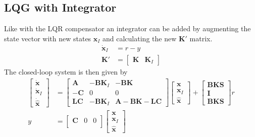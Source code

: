 \subsection{LQG with Integrator}
Like with the LQR compensator an integrator can be added by augmenting the state vector with new states $\mathbf{x}_I$ and calculating the new $\mathbf{K'}$ matrix.
\begin{align*}
    \dot{\mathbf{x}}_I & = r - y                     \\
    \mathbf{K'}        & = \begin{bmatrix}
                               \mathbf{K} & \mathbf{K}_I
                           \end{bmatrix}
\end{align*}
The closed-loop system is then given by
\begin{align*}
    \begin{bmatrix}
        \dot{\mathbf{x}}   \\
        \dot{\mathbf{x}}_I \\
        \dot{\hat{\textbf{x}}}
    \end{bmatrix}
      & =
    \begin{bmatrix}
        \mathbf{A}  & \mathbf{-BK}_I & \mathbf{-BK}     \\
        \mathbf{-C} & 0              & 0                \\
        \mathbf{LC} & \mathbf{-BK}_I & \mathbf{A-BK-LC}
    \end{bmatrix}
    \begin{bmatrix}
        \mathbf{x}   \\
        \mathbf{x}_I \\
        \hat{\textbf{x}}
    \end{bmatrix}
    +
    \begin{bmatrix}
        \mathbf{BKS} \\
        \mathbf{I}   \\
        \mathbf{BKS}
    \end{bmatrix}
    r                        \\
    y & = \begin{bmatrix}
              \mathbf{C} & 0 & 0 \\
          \end{bmatrix}
    \begin{bmatrix}
        \mathbf{x}   \\
        \mathbf{x}_I \\
        \hat{\textbf{x}}
    \end{bmatrix}
\end{align*}

